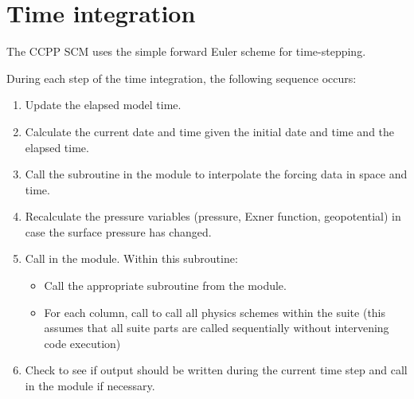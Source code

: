 \section{Time integration}
\label{section: time integration}
The CCPP SCM uses the simple forward Euler scheme for time-stepping.

During each step of the time integration, the following sequence occurs:
\begin{enumerate}
\item Update the elapsed model time.
\item Calculate the current date and time given the initial date and time and the elapsed time.
\item Call the  subroutine in the  module to interpolate the forcing data in space and time.
\item Recalculate the pressure variables (pressure, Exner function, geopotential) in case the surface pressure has changed.
\item Call  in the  module. Within this subroutine:
\begin{itemize}
\item Call the appropriate  subroutine from the  module.
\item For each column, call  to call all physics schemes within the suite (this assumes that all suite parts are called sequentially without intervening code execution)
\end{itemize}
\item Check to see if output should be written during the current time step and call  in the  module if necessary.
\end{enumerate}

